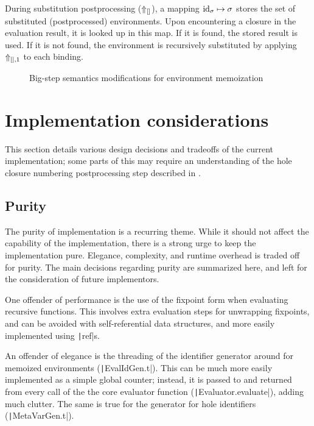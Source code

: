During substitution postprocessing ($\Uparrow_{[]}$), a mapping $\text{id}_\sigma\mapsto\sigma$ stores the set of substituted (postprocessed) environments. Upon encountering a closure in the evaluation result, it is looked up in this map. If it is found, the stored result is used. If it is not found, the environment is recursively substituted by applying $\Uparrow_{[],1}$ to each binding.


\begin{figure}
  \centering
  \begin{mdframed}
    \begin{singlespace}
      
    \end{singlespace}
  \end{mdframed}
  \caption{Big-step semantics modifications for environment memoization}
  \label{fig:big-step-memoization-rules}
\end{figure}

\section{Implementation considerations}
\label{sec:evalenv_impl_considerations}

This section details various design decisions and tradeoffs of the current implementation; some parts of this may require an understanding of the hole closure numbering postprocessing step described in .

\subsection{Purity}
\label{sec:env-purity}
The purity of implementation is a recurring theme. While it should not affect the capability of the implementation, there is a strong urge to keep the implementation pure. Elegance, complexity, and runtime overhead is traded off for purity. The main decisions regarding purity are summarized here, and left for the consideration of future implementors.

One offender of performance is the use of the fixpoint form when evaluating recursive functions. This involves extra evaluation steps for unwrapping fixpoints, and can be avoided with self-referential data structures, and more easily implemented using \texttt|ref|s.

An offender of elegance is the threading of the identifier generator around for memoized environments (\texttt|EvalIdGen.t|). This can be much more easily implemented as a simple global counter; instead, it is passed to and returned from every call of the the core evaluator function (\texttt|Evaluator.evaluate|), adding much clutter. The same is true for the generator for hole identifiers (\texttt|MetaVarGen.t|).

